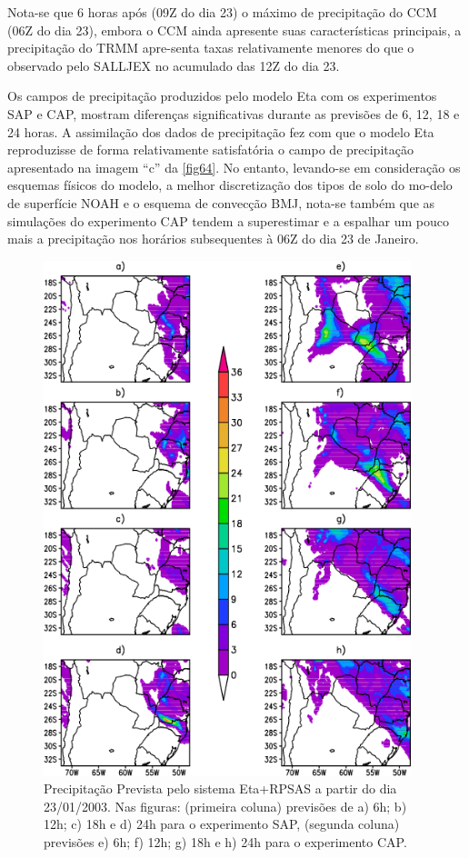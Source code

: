 Nota-se que 6 horas após (09Z do dia 23) o máximo de precipitação do CCM (06Z do dia 23), embora o CCM ainda apresente suas características principais, a precipitação do TRMM apre-senta taxas relativamente menores do que o observado pelo SALLJEX no acumulado das 12Z do dia 23. 

Os campos de precipitação produzidos pelo modelo Eta com os experimentos SAP e CAP, mostram diferenças significativas durante as previsões de 6, 12, 18 e 24 horas. A assimilação dos dados de precipitação fez com que o modelo Eta reproduzisse de forma relativamente satisfatória o campo de precipitação apresentado na imagem ``c'' da \autoref{fig64}. No entanto, levando-se em consideração os esquemas físicos do modelo,  a melhor discretização dos tipos de solo do mo-delo de superfície NOAH e o esquema de convecção BMJ, nota-se também que as simulações do experimento CAP tendem a superestimar e a espalhar um pouco mais a precipitação nos horários subsequentes à 06Z do dia 23 de Janeiro.

\begin{figure}[!hpb]
\centering
\includegraphics[height=15cm]{./figs/prec_eta1.png}
\caption{Precipitação Prevista pelo sistema Eta+RPSAS a partir do dia 23/01/2003. Nas figuras: (primeira coluna) previsões de a) 6h; b) 12h; c) 18h e d) 24h para o experimento SAP, (segunda coluna) previsões e) 6h; f) 12h; g) 18h e h) 24h para o experimento CAP.}
\label{fig64}
\end{figure}

